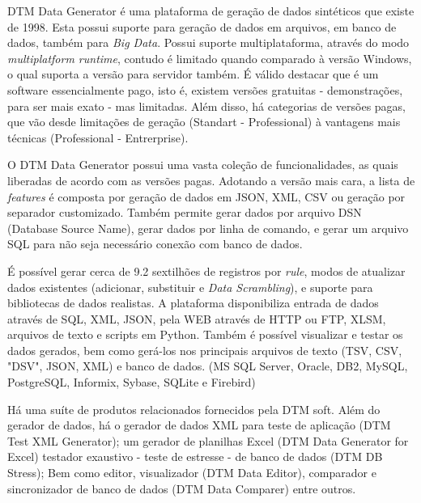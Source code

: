 \documentclass[
	12pt,				%
	openright,			%
	twoside,			%
	a4paper,			%
	english,			%
	brazil				%
	]{abntex2}
\begin{document}
			DTM Data Generator \cite{DTMDataGenerator} é uma plataforma de geração de dados sintéticos que existe de 1998.
			Esta possui suporte para geração de dados em arquivos, em banco de dados, também para \emph{Big Data}.
			Possui suporte multiplataforma, através do modo \emph{multiplatform runtime}, contudo é limitado quando comparado à versão Windows, o qual suporta a versão para servidor também.
			É válido destacar que é um software essencialmente pago, isto é, existem versões gratuitas - demonstrações, para ser mais exato - mas limitadas.
			Além disso, há categorias de versões pagas, que vão desde limitações de geração (Standart - Professional) à vantagens mais técnicas (Professional - Entrerprise).
			\par
			O DTM Data Generator possui uma vasta coleção de funcionalidades, as quais liberadas de acordo com as versões pagas.
			Adotando a versão mais cara, a lista de \emph{features} é composta por geração de dados em JSON, XML, CSV ou geração por separador customizado.
			Também permite gerar dados por arquivo DSN (Database Source Name), gerar dados por linha de comando, e gerar um arquivo SQL para não seja necessário conexão com banco de dados.
			\par
			É possível gerar cerca de 9.2 sextilhões de registros por \emph{rule}, modos de atualizar dados existentes (adicionar, substituir e \emph{Data Scrambling}), e suporte para bibliotecas de dados realistas.
			A plataforma disponibiliza entrada de dados através de SQL, XML, JSON, pela WEB através de HTTP ou FTP, XLSM, arquivos de texto e scripts em Python.
			Também é possível visualizar e testar os dados gerados, bem como gerá-los nos principais arquivos de texto (TSV, CSV, "DSV", JSON, XML) e banco de dados. (MS SQL Server, Oracle, DB2, MySQL, PostgreSQL, Informix, Sybase, SQLite e Firebird) 
			\par
			Há uma suíte de produtos relacionados fornecidos pela DTM soft. 
			Além do gerador de dados, 
				há o gerador de dados XML para teste de aplicação (DTM Test XML Generator);
				um gerador de planilhas Excel (DTM Data Generator for Excel)
				testador exaustivo - teste de estresse - de banco de dados (DTM DB Stress);
				Bem como editor, visualizador (DTM Data Editor), comparador e sincronizador de banco de dados (DTM Data Comparer) entre outros. 
\end{document}
